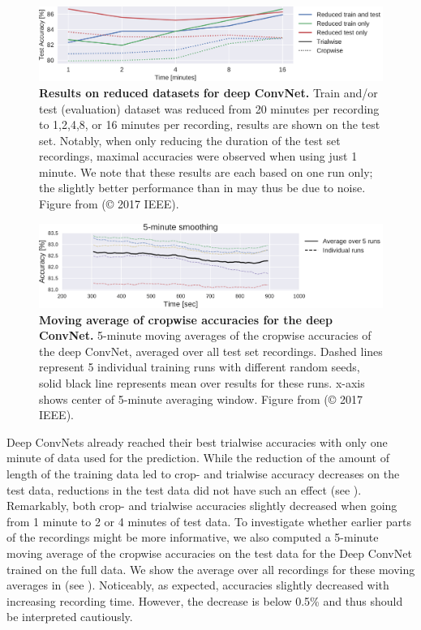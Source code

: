 \begin{figure}[htbp]
\myfloatalign
\includegraphics[width=\linewidth]{images/Time_Plot.pdf-1.png}
\caption[Results on reduced datasets for deep ConvNet]{\textbf{Results on reduced datasets for deep ConvNet.} Train and/or test (evaluation) dataset was reduced from 20 minutes per recording to 1,2,4,8, or 16 minutes per recording, results are shown on the test set. Notably, when only reducing the duration of the test set recordings, maximal accuracies were observed  when using just 1 minute. We note that these results are each based on one run only; the slightly better performance than in  may thus be due to noise. Figure from \citet{schirrmeisterdeeppathology} (© 2017 IEEE).}
\label{pathology-time-fig}
\end{figure}

\begin{figure}[htbp]
\myfloatalign
\includegraphics[width=\linewidth]{images/Time_Crop_Pred_Plot.pdf-1.png}
\caption[Moving average of cropwise accuracies for the deep ConvNet.]{\textbf{Moving average of cropwise accuracies for the deep ConvNet.}
5-minute moving averages of the cropwise accuracies of the deep ConvNet, averaged over all test set recordings.
Dashed lines represent 5 individual training runs with different random seeds, solid black line represents mean over results for these runs.
x-axis shows center of 5-minute averaging window.
Figure from \citet{schirrmeisterdeeppathology} (© 2017 IEEE).}
\label{time-crop-pred-fig}
\end{figure}

    Deep ConvNets already reached their best trialwise accuracies with only
one minute of data used for the prediction. While the reduction of the
amount of length of the training data led to crop- and trialwise
accuracy decreases on the test data, reductions in the test data did not
have such an effect (see ).
Remarkably, both crop- and trialwise accuracies slightly decreased when
going from 1 minute to 2 or 4 minutes of test data. To investigate
whether earlier parts of the recordings might be more informative, we
also computed a 5-minute moving average of the cropwise accuracies on
the test data for the Deep ConvNet trained on the full data. We show the
average over all recordings for these moving averages in (see
). Noticeably, as expected,
accuracies slightly decreased with increasing recording time. However,
the decrease is below 0.5\% and thus should be interpreted cautiously.

